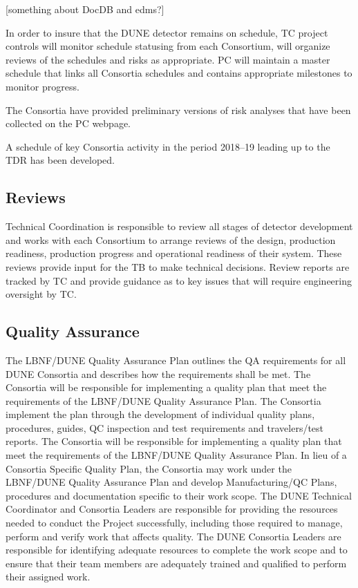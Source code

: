 [something about DocDB and edms?]

In order to insure that the DUNE detector remains on schedule, TC
project controls will monitor schedule statusing from each Consortium,
will organize reviews of the schedules and risks as appropriate. PC
will maintain a master schedule that links all Consortia schedules and
contains appropriate milestones to monitor progress.

The Consortia have provided preliminary versions of risk analyses that
have been collected on the PC webpage.

A schedule of key Consortia activity in the period 2018--19 leading up
to the TDR has been developed.

\subsection{Reviews}
\label{sec:fdsp-coord-reviews}

Technical Coordination is responsible to review all stages of detector
development and works with each Consortium to arrange reviews of the
design, production readiness, production progress and operational
readiness of their system.  These reviews provide input for the TB to
make technical decisions.  Review reports are tracked by TC and
provide guidance as to key issues that will require engineering
oversight by TC.

\subsection{Quality Assurance}
\label{sec:fdsp-coord-qa}


The LBNF/DUNE Quality Assurance Plan outlines the QA requirements for
all DUNE Consortia and describes how the requirements shall be
met. The Consortia will be responsible for implementing a quality plan
that meet the requirements of the LBNF/DUNE Quality Assurance Plan.
The Consortia implement the plan through the development of individual
quality plans, procedures, guides, QC inspection and test requirements
and travelers/test reports.  The Consortia will be responsible for
implementing a quality plan that meet the requirements of the
LBNF/DUNE Quality Assurance Plan. In lieu of a Consortia Specific
Quality Plan, the Consortia may work under the LBNF/DUNE Quality
Assurance Plan and develop Manufacturing/QC Plans, procedures and
documentation specific to their work scope.  The DUNE Technical
Coordinator and Consortia Leaders are responsible for providing the
resources needed to conduct the Project successfully, including those
required to manage, perform and verify work that affects quality.  The
DUNE Consortia Leaders are responsible for identifying adequate
resources to complete the work scope and to ensure that their team
members are adequately trained and qualified to perform their assigned
work.

